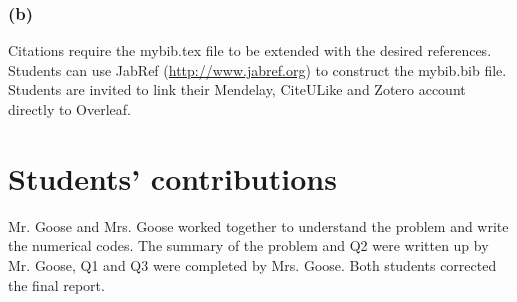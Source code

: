 \documentclass[12pt,twoside,letterpaper]{article}
\begin{document}
\subsubsection*{(b)} Citations require the mybib.tex file to be extended with the desired references. Students can use JabRef (\url{http://www.jabref.org}) to construct the mybib.bib file. Students are invited to link their Mendelay, CiteULike and Zotero account directly to Overleaf. 
%


\vfill

\section*{Students' contributions}
Mr. Goose and Mrs. Goose worked together to understand the problem and write the numerical codes. The summary of the problem and Q2 were written up by Mr. Goose, Q1 and Q3 were completed by Mrs. Goose. Both students corrected the final report.

\newpage

\end{document}
